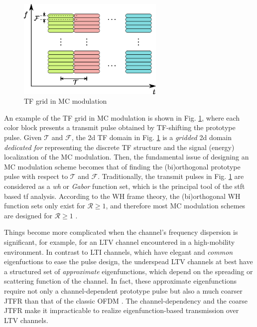\documentclass[journal]{IEEEtran}
\begin{document}
\begin{figure}
  \centering
  \includegraphics[width=7cm]{tf_grid_only}
  \caption{TF grid in MC modulation}
  \label{tf_grid}
  \vspace*{-4mm}
\end{figure}

An example of the TF grid in MC modulation is shown in Fig. \ref{tf_grid}, where each color block presents a transmit pulse obtained by TF-shifting the prototype pulse.
Given $\mathcal T$ and $\mathcal F$, the \ac{2d} TF domain in Fig. \ref{tf_grid} is a \emph{gridded} \ac{2d} domain \emph{dedicated for} representing the discrete TF structure and the signal (energy) localization of the MC modulation.
Then, the fundamental issue of designing an MC modulation scheme becomes that of finding the (bi)orthogonal prototype pulse with respect to $\mathcal T$ and $\mathcal F$. Traditionally, the transmit pulses in Fig. \ref{tf_grid} are considered as a \emph{\ac{wh}} or \emph{Gabor} function set\cite{tff}, which is the principal tool of the \ac{stft} based \ac{tf} analysis\cite{wavelet,gaborana,ftfa}.
According to the WH frame theory, the (bi)orthogonal WH function sets only exist for $\mathcal R \ge 1$\cite{wexler1990,janssen1995}, and therefore most MC modulation schemes are designed for $\mathcal R \ge 1$ \cite{tff,mct}.

Things become more complicated when the channel's frequency dispersion is significant, for example, for an LTV channel encountered in a high-mobility environment.
In contrast to LTI channels, which have elegant and \emph{common} eigenfuctions to ease the pulse design, the underspead LTV channels at best have a structured set of \emph{approximate} eigenfunctions, which depend on the spreading or scattering function of the channel\cite{eigen}.
In fact, these approximate eigenfunctions require not only a channel-dependent prototype pulse but also a much coarser JTFR than that of the classic OFDM \cite{eigen,matz07}.
The channel-dependency and the coarse JTFR make it impracticable to realize eigenfunction-based transmission over LTV channels.
\end{document}
